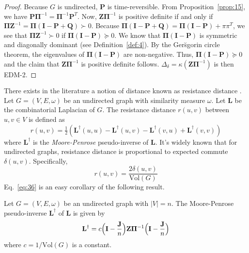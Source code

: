 \begin{proof}
  Because $G$ is undirected, $\mathbf{P}$ is time-reversible. From
  Proposition~\ref{prop:15}, we have $\mathbf{P}\bm{\Pi}^{-1} =
  \bm{\Pi}^{-1}\mathbf{P}^{T}$. Now, $\mathbf{Z}\bm{\Pi}^{-1}$ is
  positive definite if and only if $\bm{\Pi}\mathbf{Z}^{-1} =
  \bm{\Pi}(\mathbf{I} - \mathbf{P} + \mathbf{Q}) \succ 0$. Because
  $\bm{\Pi}(\mathbf{I} - \mathbf{P} + \mathbf{Q}) =
  \bm{\Pi}(\mathbf{I} - \mathbf{P}) + \pi\pi^{T}$, we see that
  $\bm{\Pi}\mathbf{Z}^{-1} \succ 0$ if $\bm{\Pi}(\mathbf{I} -
  \mathbf{P}) \succeq 0$. We know that $\bm{\Pi}(\mathbf{I} -
  \mathbf{P})$ is symmetric and diagonally dominant (see
  Definition~\ref{def:4}). By the Ger\u{s}gorin circle theorem, the
  eigenvalues of $\bm{\Pi}(\mathbf{I} - \mathbf{P})$ are
  non-negative. Thus, $\bm{\Pi}(\mathbf{I} - \mathbf{P}) \succeq 0$
  and the claim that $\mathbf{Z}\bm{\Pi}^{-1}$ is positive definite
  follows. $\Delta_{\delta} = \kappa(\mathbf{Z}\bm{\Pi}^{-1})$ is then
  EDM-2.
\end{proof}
%
There exists in the literature a notion of distance known as
resistance distance
\citep{bapat99:_resis_distan_in_graph,klein93:_resis_distan}. Let $G =
(V,E,\omega)$ be an undirected graph with similarity measure
$\omega$. Let $\mathbf{L}$ be the combinatorial Laplacian of $G$. The
resistance distance $r(u,v)$ between $u, v \in V$ is defined as
\begin{equation}
  \label{eq:35}
  r(u,v) = \tfrac{1}{2}(\mathbf{L}^{\dagger}(u,u) - \mathbf{L}^{\dagger}(u,v) -
  \mathbf{L}^{\dagger}(v,u) + \mathbf{L}^{\dagger}(v,v))
\end{equation}
where $\mathbf{L}^{\dagger}$ is the {\em Moore-Penrose} \/pseudo-inverse of
$\mathbf{L}$. It's widely known that for undirected graphs, resistance
distance is proportional to expected commute
$\delta(u,v)$. Specifically,
\begin{equation}
  \label{eq:36}
  r(u,v) = \frac{2 \delta(u,v)}{\mathrm{Vol}(G)}
\end{equation}
Eq.~\eqref{eq:36} is an easy corollary of the following result.
\begin{proposition}
  \label{prop:11}
  Let $G = (V,E,\omega)$ be an undirected graph with $|V| = n$. The
  Moore-Penrose pseudo-inverse $\mathbf{L}^{\dagger}$ of $\mathbf{L}$
  is given by
  \begin{equation}
    \label{eq:37}
    \mathbf{L}^{\dagger} = c \Bigl(\mathbf{I} - \frac{\mathbf{J}}{n}\Bigr) \mathbf{Z}
    \bm{\Pi}^{-1} \Bigl(\mathbf{I} - \frac{\mathbf{J}}{n}\Bigr)
  \end{equation}
  where $c = 1/\mathrm{Vol}(G)$ is a constant. 
\end{proposition}
